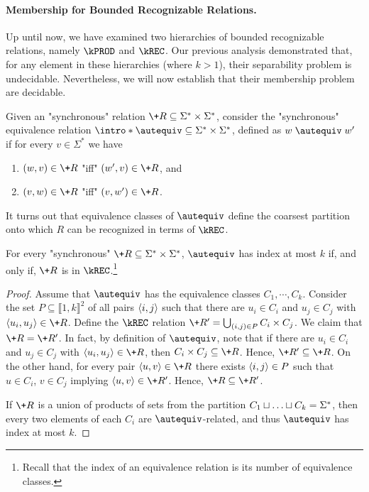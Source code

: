 \paragraph*{Membership for Bounded Recognizable Relations.}
Up until now, we have examined two hierarchies of bounded recognizable relations, namely $\kPROD$ and $\kREC$. 
Our previous analysis demonstrated that, for any element in these hierarchies (where $k>1$), their separability problem is undecidable. Nevertheless, 
we will now establish that their membership problem are decidable.

\AP Given an "synchronous" relation $\+R \subseteq \Sigma^* \times \Sigma^*$, consider the "synchronous" equivalence relation $\intro*\autequiv \subseteq \Sigma^* \times \Sigma^*$, defined as $w \mathrel{\autequiv} w'$ if for every $v \in \Sigma^*$ we have 
\begin{enumerate}
    \item $(w,v) \in \+R$ "iff" $(w',v) \in \+R$, and
    \item $(v,w) \in \+R$ "iff" $(v,w') \in \+R$.
\end{enumerate}

It turns out that equivalence classes of $\autequiv$ define the coarsest partition onto which $R$ can be recognized in terms of $\kREC$.

\begin{lemma}\AP\label{lem:krec-characterization}
    For every "synchronous" $\+R \subseteq \Sigma^* \times \Sigma^*$, $\autequiv$ has index at most $k$ if, and only if, $\+R$ is in $\kREC$.\footnote{Recall that the index of an equivalence relation is its number of equivalence classes.}
\end{lemma}
\begin{proof}
    Assume that $\autequiv$ has the equivalence classes $C_1, \cdots, C_k$. Consider the set $P \subseteq \lBrack 1,k\rBrack^2$ of all pairs $\langle i,j\rangle$ such that there are $u_i \in C_i$ and $u_j \in C_j$ with $\tup{u_i,u_j} \in \+R$. Define the $\kREC$ relation $\+R' = \bigcup_{(i,j) \in P} C_i \times C_j$. We claim that $\+R=\+R'$. 
    In fact, by definition of $\autequiv$, note that if there are $u_i \in C_i$ and $u_j \in C_j$ with $\tup{u_i,u_j} \in \+R$, then $C_i \times C_j \subseteq \+R$. Hence, $\+R' \subseteq \+R$.
    On the other hand, for every pair $\tup{u,v} \in \+R$ there exists $\langle i,j\rangle \in P$ such that $u \in C_i$, $v \in C_j$ implying $\tup{u,v} \in \+R'$.
    Hence, $\+R \subseteq \+R'$.

    If $\+R$ is a union of products of sets from the partition $C_1 \sqcup \hdots \sqcup C_k = \Sigma^*$, then every two elements of each $C_i$ are $\autequiv$-related, and thus $\autequiv$ has index at most $k$.
\end{proof}

